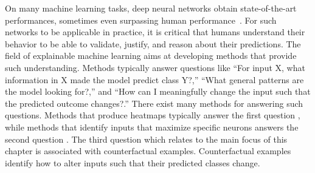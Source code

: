 \documentclass[11pt,a4paper,twoside,openright,final]{memoir}
\begin{document}
On many machine learning tasks, deep neural networks obtain state-of-the-art performances, sometimes even surpassing human performance~\cite{noisyStudent}.
For such networks to be applicable in practice, it is critical that humans understand their behavior to be able to validate, justify, and reason about their predictions. 
The field of explainable machine learning aims at developing methods that provide such understanding.
Methods typically answer questions like ``For input X, what information in X made the model predict class Y?,''  ``What general patterns are the model looking for?,'' and ``How can I meaningfully change the input such that the predicted outcome changes?.'' 
There exist many methods for answering such questions. 
Methods that produce heatmaps typically answer the first question \cite{lrp}, while methods that identify inputs that maximize specific neurons answers the second question \cite{carter2019activation}. 
The third question which relates to the main focus of this chapter is associated with counterfactual examples.
Counterfactual examples identify how to alter inputs such that their predicted classes change.
\end{document}
